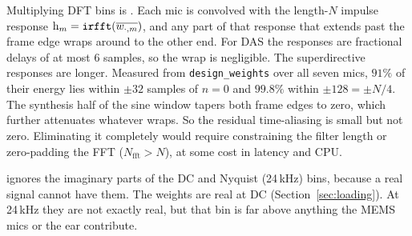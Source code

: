 \documentclass[11pt]{article}
\begin{document}
Multiplying DFT bins is . Each mic is convolved with the length-$N$
impulse response $\mathrm{h}_m=\code{irfft}(\overline{w_{\cdot,m}})$, and any part of that
response that extends past the frame edge wraps around to the other end. For DAS the responses
are fractional delays of at most 6 samples, so the wrap is negligible. The superdirective
responses are longer. Measured from \texttt{design\_weights} over all seven mics, $91\%$ of
their energy lies within $\pm32$ samples of $n=0$ and $99.8\%$ within $\pm128=\pm N/4$.
The synthesis half of the sine window tapers both frame edges to zero, which further
attenuates whatever wraps. So the residual time-aliasing is small but not zero. Eliminating it
completely would require constraining the filter length or zero-padding the FFT
($N_{\text{fft}}>N$), at some cost in latency and CPU.

\begin{remark}
 ignores the imaginary parts of the DC and Nyquist (24\,kHz) bins, because a real
signal cannot have them. The weights are real at DC (Section~\ref{sec:loading}). At 24\,kHz they
are not exactly real, but that bin is far above anything the MEMS mics or the ear contribute.
\end{remark}
\end{document}
